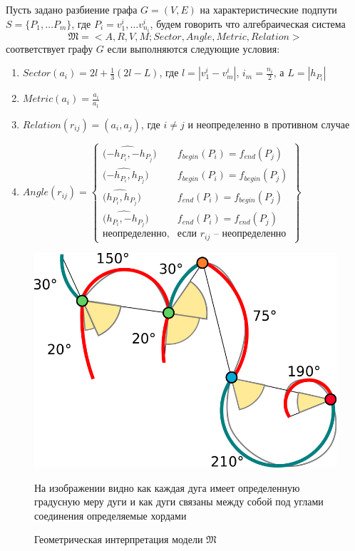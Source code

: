 \begin{definition}
Пусть задано разбиение графа $G=(V,E)$ на характеристические подпути $S=\{P_1, \dots P_m\}$, где $P_i=v^i_1, \dots v^i_{n_i}$, будем говорить что алгебраическая система
$$\mathfrak{M} = < A, R, V, M; Sector, Angle, Metric, Relation >$$
соответствует графу $G$ если выполняются следующие условия:
\begin{enumerate}
\item $Sector(a_i) = 2l + \frac{1}{3}(2l - L)$, где $l=|v^i_1-v^i_m|$, $i_m = \frac{n_i}{2}$,  а $L=|h_{P_i}|$
\item $Metric(a_i) = \frac{a_i}{a_1}$
\item $Relation(r_{ij}) = (a_i, a_j)$, где $i\neq j$ и неопределенно в противном случае
\item $Angle(r_{ij})=
	\left\{		
	\begin{array}{ll}
	\hat{(-h_{P_i}, -h_{P_j}}) & f_{begin}(P_i) = f_{end}(P_j) \\
	\hat{(-h_{P_i}, h_{P_j}}) & f_{begin}(P_i) = f_{begin}(P_j) \\
	\hat{(h_{P_i}, h_{P_j}}) & f_{end}(P_i) = f_{begin}(P_j) \\
	\hat{(h_{P_i}, -h_{P_j}}) & f_{end}(P_i) = f_{end}(P_j) \\	
	\text{неопределенно}, & \text{если } r_{ij} \text{ -- неопределенно}
	\end{array}
	\right\}	$	
\end{enumerate}
\end{definition}

\begin{figure}[h]
\centering
\includegraphics[width=0.75\linewidth,keepaspectratio]{images/items}
\caption{Геометрическая интерпретация модели $\mathfrak{M}$}
\medskip
\small
На изображении видно как каждая дуга имеет определенную градусную меру дуги и как дуги связаны между собой под углами соединения определяемые хордами
\end{figure}


